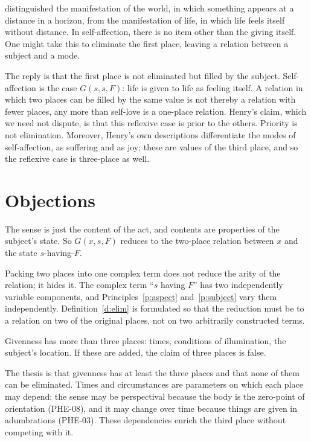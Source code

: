 \documentclass{situationist-preprint}
\begin{document}
\citet{Henry1963} distinguished the manifestation of the world, in which something appears at a distance in a horizon, from the manifestation of life, in which life feels itself without distance. In self-affection, there is no item other than the giving itself. One might take this to eliminate the first place, leaving a relation between a subject and a mode.

The reply is that the first place is not eliminated but filled by the subject. Self-affection is the case $G(s,s,F)$: life is given to life as feeling itself. A relation in which two places can be filled by the same value is not thereby a relation with fewer places, any more than self-love is a one-place relation. Henry's claim, which we need not dispute, is that this reflexive case is prior to the others. Priority is not elimination. Moreover, Henry's own descriptions differentiate the modes of self-affection, as suffering and as joy; these are values of the third place, and so the reflexive case is three-place as well.

\section{Objections}

\begin{objection}[Content]
The sense is just the content of the act, and contents are properties of the subject's state. So $G(x,s,F)$ reduces to the two-place relation between $x$ and the state $s$-having-$F$.
\end{objection}

\begin{reply}
Packing two places into one complex term does not reduce the arity of the relation; it hides it. The complex term \enquote{$s$ having $F$} has two independently variable components, and Principles~\ref{p:aspect} and~\ref{p:subject} vary them independently. Definition~\ref{d:elim} is formulated so that the reduction must be to a relation on two of the original places, not on two arbitrarily constructed terms.
\end{reply}

\begin{objection}
Givenness has more than three places: times, conditions of illumination, the subject's location. If these are added, the claim of three places is false.
\end{objection}

\begin{reply}
The thesis is that givenness has at least the three places and that none of them can be eliminated. Times and circumstances are parameters on which each place may depend: the sense may be perspectival because the body is the zero-point of orientation (PHE-08), and it may change over time because things are given in adumbrations (PHE-03). These dependencies enrich the third place without competing with it.
\end{reply}
\end{document}
